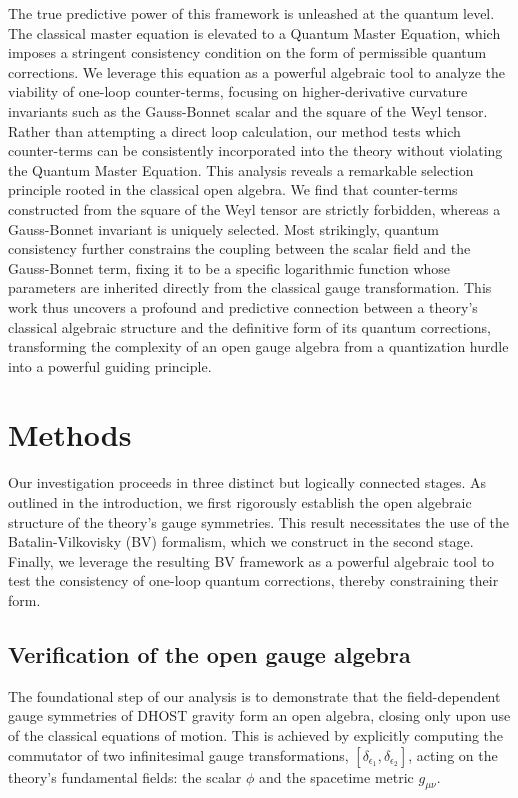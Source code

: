 \documentclass[twocolumn]{aastex631}
\begin{document}
The true predictive power of this framework is unleashed at the quantum level. The classical master equation is elevated to a Quantum Master Equation, which imposes a stringent consistency condition on the form of permissible quantum corrections. We leverage this equation as a powerful algebraic tool to analyze the viability of one-loop counter-terms, focusing on higher-derivative curvature invariants such as the Gauss-Bonnet scalar and the square of the Weyl tensor. Rather than attempting a direct loop calculation, our method tests which counter-terms can be consistently incorporated into the theory without violating the Quantum Master Equation. This analysis reveals a remarkable selection principle rooted in the classical open algebra. We find that counter-terms constructed from the square of the Weyl tensor are strictly forbidden, whereas a Gauss-Bonnet invariant is uniquely selected. Most strikingly, quantum consistency further constrains the coupling between the scalar field and the Gauss-Bonnet term, fixing it to be a specific logarithmic function whose parameters are inherited directly from the classical gauge transformation. This work thus uncovers a profound and predictive connection between a theory's classical algebraic structure and the definitive form of its quantum corrections, transforming the complexity of an open gauge algebra from a quantization hurdle into a powerful guiding principle.


\section{Methods}
\label{sec:methods}
Our investigation proceeds in three distinct but logically connected stages. As outlined in the introduction, we first rigorously establish the open algebraic structure of the theory's gauge symmetries. This result necessitates the use of the Batalin-Vilkovisky (BV) formalism, which we construct in the second stage. Finally, we leverage the resulting BV framework as a powerful algebraic tool to test the consistency of one-loop quantum corrections, thereby constraining their form.

\subsection{Verification of the open gauge algebra}
The foundational step of our analysis is to demonstrate that the field-dependent gauge symmetries of DHOST gravity form an open algebra, closing only upon use of the classical equations of motion. This is achieved by explicitly computing the commutator of two infinitesimal gauge transformations, $[\delta_{\epsilon_1}, \delta_{\epsilon_2}]$, acting on the theory's fundamental fields: the scalar $\phi$ and the spacetime metric $g_{\mu\nu}$.
\end{document}
